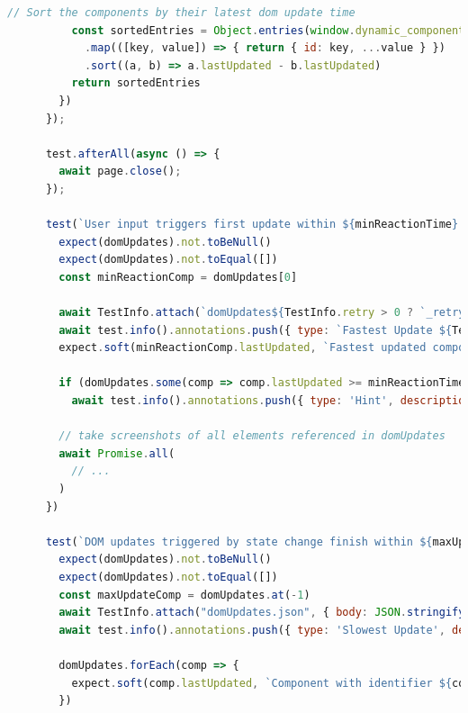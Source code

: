 \documentclass[a4paper, 10pt]{article}
\begin{document}
\begin{lstlisting}[caption={Test file for component update times}, label={lst:state-change-spec}, language=JavaScript, escapechar=°]
          // Sort the components by their latest dom update time
          const sortedEntries = Object.entries(window.dynamic_component_performance)
            .map(([key, value]) => { return { id: key, ...value } })
            .sort((a, b) => a.lastUpdated - b.lastUpdated)
          return sortedEntries
        })
      });

      test.afterAll(async () => {
        await page.close();
      });

      test(`User input triggers first update within ${minReactionTime} ms`, { tag: ['@minimalReactionTime'] }, async ({ }, TestInfo) => {
        expect(domUpdates).not.toBeNull()
        expect(domUpdates).not.toEqual([])
        const minReactionComp = domUpdates[0]

        await TestInfo.attach(`domUpdates${TestInfo.retry > 0 ? `_retry_${TestInfo.retry}` : ''}.json`, { body: JSON.stringify(domUpdates, null, 2), contentType: "application/json" })
        await test.info().annotations.push({ type: `Fastest Update ${TestInfo.retry > 0 ? `(retry #${TestInfo.retry})` : ''}`, description: `Component with id ${minReactionComp.id} loaded ${minReactionComp.lastUpdated}ms after user input (xPath: ${minReactionComp.xpath})` });
        expect.soft(minReactionComp.lastUpdated, `Fastest updated component with identifier ${minReactionComp.id} should update within ${minReactionTime} ms`).toBeLessThanOrEqual(minReactionTime)

        if (domUpdates.some(comp => comp.lastUpdated >= minReactionTime))
          await test.info().annotations.push({ type: 'Hint', description: `Screenshots below show slow updating components` });

        // take screenshots of all elements referenced in domUpdates
        await Promise.all(
          // ...
        )
      })

      test(`DOM updates triggered by state change finish within ${maxUpdateTime} ms`, { tag: ['@maximalReactionTime'] }, async ({ }, TestInfo) => {
        expect(domUpdates).not.toBeNull()
        expect(domUpdates).not.toEqual([])
        const maxUpdateComp = domUpdates.at(-1)
        await TestInfo.attach("domUpdates.json", { body: JSON.stringify(domUpdates, null, 2), contentType: "application/json" })
        await test.info().annotations.push({ type: 'Slowest Update', description: `Component with id ${maxUpdateComp.id} loaded ${maxUpdateComp.lastUpdated}ms after user input (xPath: ${maxUpdateComp.xpath})` });

        domUpdates.forEach(comp => {
          expect.soft(comp.lastUpdated, `Component with identifier ${comp.id} should finish updates within ${maxUpdateTime} ms`).toBeLessThanOrEqual(maxUpdateTime)
        })


\end{lstlisting}
\end{document}
